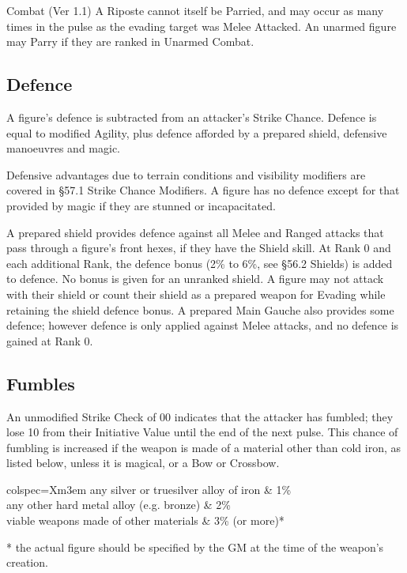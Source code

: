 \begin{Chapter}{Combat (Ver 1.1)}
A Riposte cannot itself be Parried, and may occur as many times in the
pulse as the evading target was Melee Attacked. An unarmed figure may
Parry if they are ranked in Unarmed Combat.

\subsection{Defence}

A figure’s defence is subtracted from an attacker’s Strike Chance.
Defence is equal to modified Agility, plus defence afforded by a
prepared shield, defensive manoeuvres and magic.

Defensive advantages due to terrain conditions and visibility
modifiers are covered in §57.1 Strike Chance Modifiers. A figure has
no defence except for that provided by magic if they are stunned or
incapacitated.

A prepared shield provides defence against all Melee and Ranged
attacks that pass through a figure’s front hexes, if they have the
Shield skill.  At Rank 0 and each additional Rank, the defence bonus
(2\% to 6\%, see §56.2 Shields) is added to defence. No bonus is given
for an unranked shield.  A figure may not attack with their shield or
count their shield as a prepared weapon for Evading while retaining
the shield defence bonus.  A prepared Main Gauche also provides some
defence; however defence is only applied against Melee attacks, and no
defence is gained at Rank 0.

\subsection{Fumbles}

An unmodified Strike Check of 00 indicates that the attacker has
fumbled; they lose 10 from their Initiative Value until the end of the
next pulse. This chance of fumbling is increased if the weapon is made
of a material other than cold iron, as listed below, unless it is
magical, or a Bow or Crossbow.

\begin{dqtblr}{colspec={Xm{3em}}}
any silver or truesilver alloy of iron		& 1\% \\
any other hard metal alloy (e.g. bronze)	& 2\% \\ 
viable weapons made of other materials		& 3\% (or more)* \\
\end{dqtblr}

* the actual figure should be specified by the GM at the time of the
weapon’s creation.



\end{Chapter}
